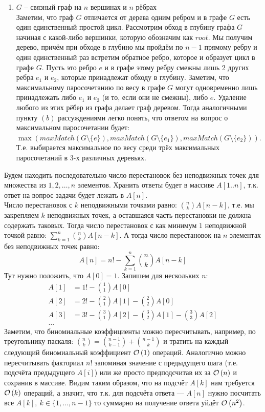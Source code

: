 \begin{enumerate}[label=(\alph*)]
\item $G$ -- связный граф на $n$ вершинах и $n$ рёбрах\\
Заметим, что граф $G$ отличается от дерева одним ребром и в графе $G$ есть один единственный простой цикл. Рассмотрим
обход в глубину графа $G$ начиная с какой-либо вершинки, которую обозначим как $root$. Мы получим дерево, причём при
обходе в глубино мы пройдём по $n-1$ прямому ребру и один единственный раз встретим обратное ребро, которое и образует цикл
в графе $G$. Пусть это ребро $e$ и в графе этому ребру смежны лишь 2 других ребра $e_1$ и $e_2$, которые принадлежат обходу
в глубину. Заметим, что максимальному паросочетанию по весу в графе $G$ могут одновременно лишь принадлежать либо $e_1$ и $e_2$
(и то, если они не смежны), либо $e$. Удаление любого из этих рёбер из графа делает граф деревом. Тогда аналогичными 
пункту $(b)$ рассуждениями легко понять, что ответом на вопрос о максимальном паросочетании будет:
$\max{(maxMatch(G\setminus \lbrace e \rbrace), maxMatch(G\setminus \lbrace e_1 \rbrace), maxMatch(G\setminus \lbrace e_2 \rbrace))}$.
Т.е. выбирается максимальное по весу среди трёх максимальных паросочетаний в 3-х различных деревьях. 
\end{enumerate}

Будем находить последовательно число перестановок без неподвижных точек для множества из $1,2,\ldots,n$ элементов. 
Хранить ответы будет в массиве $A[1..n]$, т.к. ответ на вопрос задачи будет лежать в $A[n]$.\\
Число перестановок с $k$ неподвижными точками равно: ${n \choose k}A[n-k]$, т.е. мы закрепляем $k$ неподвижных точек, а
оставшаяся часть перестановки не должна содержать таковых. Тогда число перестановок с как минимум $1$ неподвижной точкой
равно: $\sum_{k=1}^{n}{{n \choose k}A[n-k]}$. А тогда число перестановок на $n$ элементах без неподвижных точек равно:
\[
	A[n] = n! - \sum_{k=1}^{n}{{n \choose k}A[n-k]}
\]
Тут нужно положить, что $A[0]=1$. 
Запишем для нескольких $n$:
\begin{align*}
A[1] & = 1! - {1 \choose 1}A[0] \\
A[2] & = 2! - {2 \choose 1}A[1] - {2 \choose 2}A[0]\\
A[3] & = 3! - {3 \choose 1}A[2] - {3 \choose 2}A[1] - {3 \choose 3}A[2]\\
\ldots
\end{align*}
Заметим, что биномиальные коэффициенты можно пересчитывать, например, по треугольнику паскаля: 
${n \choose k} = {n-1 \choose k-1} + {n-1 \choose k}$ и тратить на каждый следующий биномиальный коэффициент $\mathcal{O}\left(1\right)$
операций. Аналогично можно пересчитывать факториал $n!$ запоминая значение с предыдущего шага (т.е. подсчёта предыдущего $A[i]$)
или же просто предподсчитав их за $\mathcal{O}\left(n\right)$ и сохранив в массиве. Видим таким образом, что на подсчёт $A[k]$ нам требуется
$\mathcal{O}\left(k\right)$ операций, а значит, что т.к. для подсчёта ответа --- $A[n]$ нужно посчитать все $A[k],\ k\in \lbrace 1,\ldots,n-1\rbrace$
то суммарно на получение ответа уйдёт $\mathcal{O}\left(n^2\right)$. \xqed 

